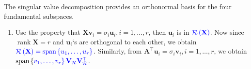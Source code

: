 \documentclass[14pt]{article}
\theoremstyle{definition}
\theoremstyle{remark}
\newenvironment{remark}
  {\pushQED{\qed}\renewcommand{\qedsymbol}{$\triangle$}\remarkx}
  {\popQED\endremarkx}
\begin{document}
The singular value decomposition provides an orthonormal basis for the four fundamental subspaces.
\begin{remark}\hfill
    \begin{enumerate}
        \item Use the property that 
        $\mathbf{X}\mathbf{v}_{i}=\sigma_{i} \mathbf{u}_{i}, i = 1, \ldots, r$, 
        then $\mathbf{u}_{i}$ is in $\color{blue}{\mathcal{R}\left(\mathbf{X}\right)}$. 
        Now since $\operatorname*{rank}\mathbf{X} = r$ and $\mathbf{u}_i$`s are orthogonal to each other, 
        we obtain $\color{blue}{\mathcal{R}\left(\mathbf{X}\right)} =
        \text{span}\left\{\color{blue}{u_{1}},\dots,\color{blue}{u_{r}}\right\}$. 
        Similarly, from $\mathbf{A}^{\top} \mathbf{u}_{i}=\sigma_{i} \mathbf{v}_{i}, i = 1, \ldots, r$, 
        we obtain $\text{span}\left\{\color{blue}{v_{1}},\dots,\color{blue}{v_{r}}\right\}   
        {\color{blue}\mathbf{V}_{\mathcal{R}}} {\color{blue}\mathbf{V}_{\mathcal{R}}^\top}$. 
    \end{enumerate}
    
\end{remark}
\end{document}
